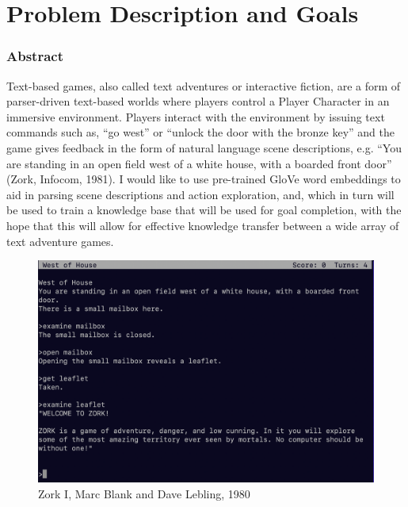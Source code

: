 \section{Problem Description and Goals}

\begin{frame}
    \frametitle{Abstract}
    Text-based games, also called text adventures or interactive
    fiction, are a form of parser-driven text-based worlds where players
    control a Player Character in an immersive environment. Players
    interact with the environment by issuing text commands such as, ``go
    west'' or ``unlock the door with the bronze key'' and the game gives
    feedback in the form of natural language scene descriptions, e.g.
    ``You are standing in an open field west of a white house, with a
    boarded front door'' (Zork, Infocom, 1981). I would like to use
    pre-trained GloVe word embeddings to aid in parsing scene
    descriptions and action exploration, and, which in turn will be used
    to train a knowledge base that will be used for goal completion,
    with the hope that this will allow for effective knowledge transfer
    between a wide array of text adventure games.
\end{frame}

\begin{frame}[b]
    \begin{figure}
        \centering
        \includegraphics[width=\textwidth,keepaspectratio]{../images/zork1.png}
        \caption*{Zork I, Marc Blank and Dave Lebling, 1980}
    \end{figure}
\end{frame}


